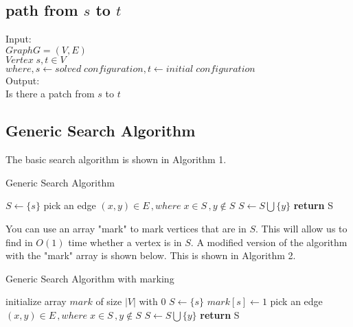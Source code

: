 \documentclass{article}
\begin{document}
\subsection{path from $s$ to $t$}
Input:\\
 		$Graph G = (V,E)$ \\
		$Vertex\; s, t \in V$\\
		$where, s\leftarrow solved\;configuration, t\leftarrow initial\;configuration$
\\
Output:\\
Is there a patch from $s$ to $t$\\

\subsection{Generic Search Algorithm}

The basic search algorithm is shown in Algorithm 1.\\

\begin{algorithm}
\caption{Generic Search Algorithm}\label{A generic search algorithm}
\begin{algorithmic}[1]
	\State $S\gets \{s\}$
	\Repeat
		\State pick an edge $(x,y) \in E\,,where\; x\in S\,,y\notin S$
		\State $S\gets S\bigcup \{y\}$
	\State \textbf{return} S
\EndProcedure
\end{algorithmic}
\end{algorithm}

You can use an array "mark" to mark vertices that are in $S$. This will allow us to find in $O(1)$ time whether a vertex is in $S$.  A modified version of the algorithm with the "mark" array is shown below. This is shown in Algorithm 2.\\

\begin{algorithm}
\caption{Generic Search Algorithm with marking}\label{A generic search algorithm}
\begin{algorithmic}[1]
	\State initialize array $mark$ of size $|V|$ with 0
	\State $S\gets \{s\}$
	\State $mark[s] \gets 1$
	\Repeat
		\State pick an edge $(x,y) \in E\,,where\; x\in S\,,y\notin S$
		\State $S\gets S\bigcup \{y\}$
	\State \textbf{return} S
\EndProcedure
\end{algorithmic}
\end{algorithm}
\end{document}
